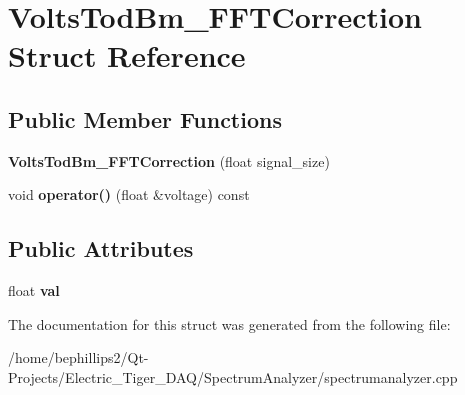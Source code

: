 \hypertarget{struct_volts_tod_bm___f_f_t_correction}{}\section{Volts\+Tod\+Bm\+\_\+\+F\+F\+T\+Correction Struct Reference}
\label{struct_volts_tod_bm___f_f_t_correction}
\subsection*{Public Member Functions}
\begin{DoxyCompactItemize}
\item 
{\bfseries Volts\+Tod\+Bm\+\_\+\+F\+F\+T\+Correction} (float signal\+\_\+size)\hypertarget{struct_volts_tod_bm___f_f_t_correction_a0a4bc4668c833489861e695f850a77e0}{}\label{struct_volts_tod_bm___f_f_t_correction_a0a4bc4668c833489861e695f850a77e0}

\item 
void {\bfseries operator()} (float \&voltage) const \hypertarget{struct_volts_tod_bm___f_f_t_correction_ae989253eee4929035aefa5c85dc77cac}{}\label{struct_volts_tod_bm___f_f_t_correction_ae989253eee4929035aefa5c85dc77cac}

\end{DoxyCompactItemize}
\subsection*{Public Attributes}
\begin{DoxyCompactItemize}
\item 
float {\bfseries val}\hypertarget{struct_volts_tod_bm___f_f_t_correction_a1e301eb193f2a998e8dafe336d964a8b}{}\label{struct_volts_tod_bm___f_f_t_correction_a1e301eb193f2a998e8dafe336d964a8b}

\end{DoxyCompactItemize}


The documentation for this struct was generated from the following file\+:\begin{DoxyCompactItemize}
\item 
/home/bephillips2/\+Qt-\/\+Projects/\+Electric\+\_\+\+Tiger\+\_\+\+D\+A\+Q/\+Spectrum\+Analyzer/spectrumanalyzer.\+cpp\end{DoxyCompactItemize}
